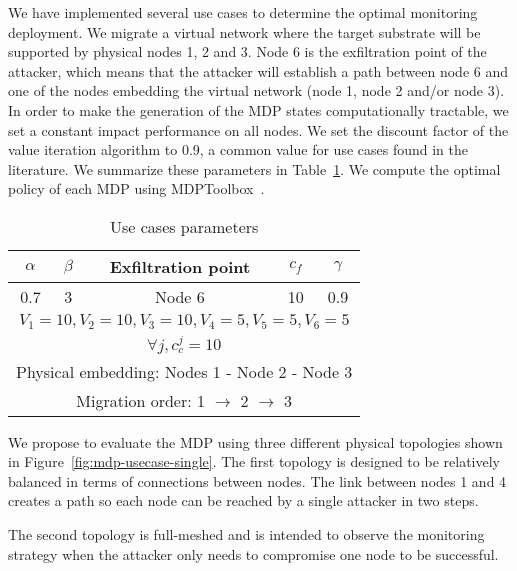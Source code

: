 We have implemented several use cases to determine the optimal monitoring deployment.
We migrate a virtual network where the target substrate will be supported by physical nodes 1, 2 and 3.
Node 6 is the exfiltration point of the attacker, which means that the attacker will establish a path between node 6 and one of the nodes embedding the virtual network (\ie node 1, node 2 and/or node 3).
In order to make the generation of the MDP states computationally tractable, we set a constant impact performance on all nodes. We set the discount factor of the value iteration algorithm to 0.9, a common value for use cases found in the literature.
We summarize these parameters in Table~\ref{tab:mdp-parameters}.
We compute the optimal policy of each MDP using MDPToolbox~\cite{Chades2014}.

\begin{table}[h]
\centering
\begin{tabular}{|c|c|l|c|c|c|}
\hline
$\alpha$ & \multicolumn{2}{c|}{$\beta$} & Exfiltration point & $c_f$ & $\gamma$ \\ \hline
0.7      & \multicolumn{2}{c|}{3}       & Node 6             & 10    & 0.9      \\ \hline
\multicolumn{6}{|c|}{$V_1=10,V_2=10,V_3=10,V_4=5,V_5=5,V_6=5$}                             \\ \hline
\multicolumn{6}{|c|}{$\forall j, c_c^j=10$}                             \\ \hline
\multicolumn{6}{|l|}{Physical embedding: Nodes 1 - Node 2 - Node 3}             \\ \hline
\multicolumn{6}{|c|}{Migration order: 1 $\rightarrow$ 2 $\rightarrow$ 3}                              \\ \hline
\end{tabular}
\caption{Use cases parameters}
\label{tab:mdp-parameters}
\end{table}

We propose to evaluate the MDP using three different physical topologies shown in Figure~\ref{fig:mdp-usecase-single}. The first topology is designed to be relatively balanced in terms of connections between nodes. The link between nodes 1 and 4 creates a path so each node can be reached by a single attacker in two steps.

The second topology is full-meshed and is intended to observe the monitoring strategy when the attacker only needs to compromise one node to be successful.

